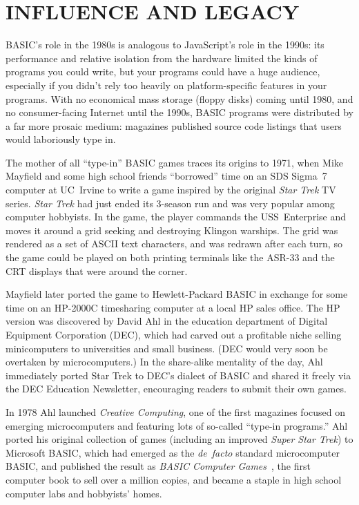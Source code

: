 

\section{INFLUENCE AND LEGACY}


BASIC's role in the 1980s is analogous to JavaScript's role in the
1990s: its performance and relative isolation from the hardware limited
the kinds of programs you could write, but your programs could have a
huge audience, especially if you didn't rely too heavily on
platform-specific features in your programs.
With no economical mass storage (floppy disks) coming until 1980, and no
consumer-facing Internet until the 1990s, BASIC programs were
distributed by a far more prosaic medium: magazines published source
code listings that users would laboriously type in.

The mother of all ``type-in'' BASIC games traces its origins to
1971, when Mike Mayfield and some high school friends ``borrowed'' time
on an SDS Sigma~7 computer at UC~Irvine to write a game inspired by the
original \emph{Star Trek} TV series.  \emph{Star Trek} had just ended its 3-season run and
was very popular among computer hobbyists.
In the game, the player commands the USS~Enterprise and moves it around
a grid seeking and destroying Klingon warships.  The grid was rendered
as a set of ASCII text characters, and was redrawn after each turn, so
the game could be played on both printing terminals like the ASR-33 and
the CRT displays that were around the corner.

Mayfield later ported the game to Hewlett-Packard BASIC in exchange for
some time on an HP-2000C timesharing computer at a local HP sales
office.
The HP version was discovered by David Ahl in the education department
of  Digital Equipment
Corporation (DEC), which had carved out a profitable niche selling
minicomputers to
universities and small business.  (DEC would very soon be overtaken by
microcomputers.)  In the share-alike mentality of the day, Ahl
immediately ported Star Trek to DEC's dialect of BASIC and shared it freely via the DEC
Education Newsletter, encouraging readers to submit their own games.

In 1978 Ahl launched \emph{Creative Computing}, one of the first
magazines focused on emerging microcomputers and featuring lots of
so-called ``type-in programs.''
Ahl ported his original collection of games (including an improved
\emph{Super Star Trek}) to Microsoft BASIC, which had emerged as the
\emph{de~facto} standard microcomputer BASIC, and published the result
as \emph{BASIC Computer Games}~\cite{basic_computer_games}, the first
computer book to sell over a million copies, and became a staple in high
school computer labs and hobbyists' homes.

